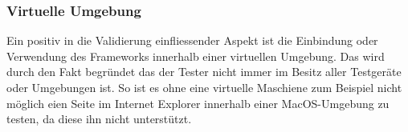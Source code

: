 	\subsubsection{Virtuelle Umgebung}
	Ein positiv in die Validierung einfliessender Aspekt ist die Einbindung oder Verwendung des Frameworks innerhalb einer 			virtuellen Umgebung. Das wird durch den Fakt begründet das der Tester nicht immer im Besitz aller Testgeräte oder 				Umgebungen ist. So ist es ohne eine virtuelle Maschiene zum Beispiel nicht möglich eien Seite im Internet Explorer innerhalb 		einer MacOS-Umgebung zu testen, da diese ihn nicht unterstützt.


